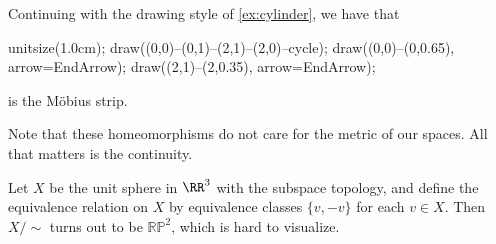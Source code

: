 \documentclass[../notes.tex]{subfiles}
\begin{document}
\begin{example}
	Continuing with the drawing style of \autoref{ex:cylinder}, we have that
	\begin{center}
		\begin{asy}
			unitsize(1.0cm);
			draw((0,0)--(0,1)--(2,1)--(2,0)--cycle);
			draw((0,0)--(0,0.65), arrow=EndArrow);
			draw((2,1)--(2,0.35), arrow=EndArrow);
		\end{asy}
	\end{center}
	is the M\"obius strip.
\end{example}
\begin{remark}
	Note that these homeomorphisms do not care for the metric of our spaces. All that matters is the continuity.
\end{remark}
\begin{example}
	Let $X$ be the unit sphere in $\RR^3$ with the subspace topology, and define the equivalence relation on $X$ by equivalence classes $\{v,-v\}$ for each $v\in X$. Then $X/{\sim}$ turns out to be $\mathbb{RP}^2$, which is hard to visualize.
\end{example}
\end{document}
